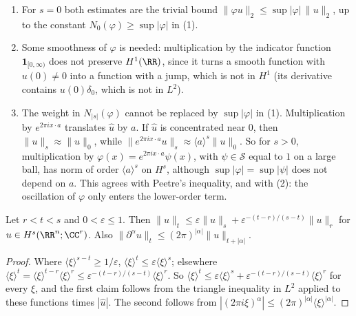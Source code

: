 \begin{example}\label{distributions:example-multiplication}
\begin{enumerate}
\item For $s = 0$ both estimates are the trivial bound $\|\varphi u\|_2 \leq \sup|\varphi|\,\|u\|_2$, up to the constant $N_0(\varphi) \geq \sup|\varphi|$ in (1).
\item Some smoothness of $\varphi$ is needed: multiplication by the indicator function $\mathbf{1}_{[0, \infty)}$ does not preserve $H^1(\RR)$, since it turns a smooth function with $u(0) \neq 0$ into a
function with a jump, which is not in $H^1$ (its derivative contains $u(0)\delta_0$, which is not in $L^2$).
\item The weight in $N_{|s|}(\varphi)$ cannot be replaced by $\sup|\varphi|$ in (1). Multiplication by $e^{2\pi ix\cdot a}$ translates $\hat u$ by $a$. If $\hat u$ is concentrated near $0$, then $\|u\|_s \approx \|u\|_0$, while
$\|e^{2\pi ix\cdot a}u\|_s \approx \langle a\rangle^s\|u\|_0$. So for $s > 0$, multiplication by $\varphi(x) = e^{2\pi ix\cdot a}\psi(x)$, with $\psi \in \mathcal{S}$ equal to $1$ on a large ball, has norm of order $\langle a\rangle^s$ on
$H^s$, although $\sup|\varphi| = \sup|\psi|$ does not depend on $a$. This agrees with Peetre's inequality, and with (2): the oscillation of $\varphi$ only enters the lower-order term.
\end{enumerate}
\end{example}

\begin{lemma}[Interpolation]\label{distributions:lemma-interpolation}
Let $r < t < s$ and $0 < \varepsilon \leq 1$. Then $\|u\|_t \leq \varepsilon\|u\|_s + \varepsilon^{-(t-r)/(s-t)}\|u\|_r$ for $u \in H^s(\RR^n; \CC^r)$. Also $\|\partial^\alpha u\|_t \leq (2\pi)^{|\alpha|}\|u\|_{t+|\alpha|}$.
\end{lemma}

\begin{proof}
Where $\langle\xi\rangle^{s-t} \geq 1/\varepsilon$, $\langle\xi\rangle^t \leq \varepsilon\langle\xi\rangle^s$; elsewhere $\langle\xi\rangle^t = \langle\xi\rangle^{t-r}\langle\xi\rangle^r \leq \varepsilon^{-(t-r)/(s-t)}\langle\xi\rangle^r$. So
$\langle\xi\rangle^t \leq \varepsilon\langle\xi\rangle^s + \varepsilon^{-(t-r)/(s-t)}\langle\xi\rangle^r$ for every $\xi$, and the first claim follows from the triangle inequality in $L^2$ applied to these functions times $|\hat u|$.
The second follows from $|(2\pi i\xi)^\alpha| \leq (2\pi)^{|\alpha|}\langle\xi\rangle^{|\alpha|}$.
\end{proof}

